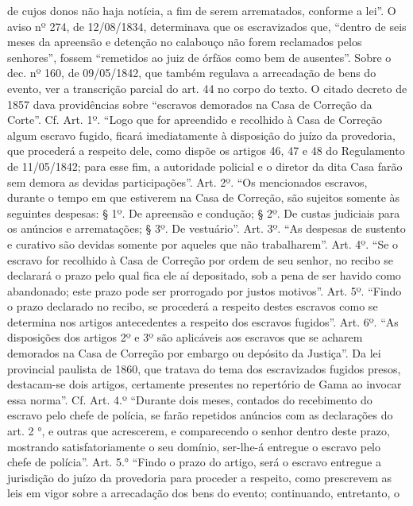 {  de cujos donos não haja notícia, a fim de serem arrematados, conforme
  a lei''. O aviso nº 274, de 12/08/1834, determinava que os escravizados
  que, ``dentro de seis meses da apreensão e detenção no calabouço não
  forem reclamados pelos senhores'', fossem ``remetidos ao juiz de órfãos
  como bem de ausentes''. Sobre o dec. nº 160, de 09/05/1842, que também
  regulava a arrecadação de bens do evento, ver a transcrição parcial do
  art. 44 no corpo do texto. O citado decreto de 1857 dava providências
  sobre ``escravos demorados na Casa de Correção da Corte''. Cf. Art.
  1º. ``Logo que for apreendido e recolhido à Casa de Correção algum
  escravo fugido, ficará imediatamente à disposição do juízo da
  provedoria, que procederá a respeito dele, como dispõe os artigos 46,
  47 e 48 do Regulamento de 11/05/1842; para esse fim, a autoridade
  policial e o diretor da dita Casa farão sem demora as devidas
  participações''. Art. 2º. ``Os mencionados escravos, durante o tempo em
  que estiverem na Casa de Correção, são sujeitos somente às seguintes
  despesas: § 1º. De apreensão e condução; § 2º. De custas judiciais
  para os anúncios e arrematações; § 3º. De vestuário''. Art. 3º. ``As
  despesas de sustento e curativo são devidas somente por aqueles que
  não trabalharem''. Art. 4º. ``Se o escravo for recolhido à Casa de
  Correção por ordem de seu senhor, no recibo se declarará o prazo pelo
  qual fica ele aí depositado, sob a pena de ser havido como abandonado;
  este prazo pode ser prorrogado por justos motivos''. Art. 5º. ``Findo o
  prazo declarado no recibo, se procederá a respeito destes escravos
  como se determina nos artigos antecedentes a respeito dos escravos
  fugidos''. Art. 6º. ``As disposições dos artigos 2º e 3º são aplicáveis
  aos escravos que se acharem demorados na Casa de Correção por embargo
  ou depósito da Justiça''. Da lei provincial paulista de 1860, que
  tratava do tema dos escravizados fugidos presos, destacam-se dois
  artigos, certamente presentes no repertório de Gama ao invocar essa
  norma''. Cf. Art. 4.º ``Durante dois meses, contados do recebimento do
  escravo pelo chefe de polícia, se farão repetidos anúncios com as
  declarações do art. 2 °, e outras que acrescerem, e comparecendo o
  senhor dentro deste prazo, mostrando satisfatoriamente o seu domínio,
  ser-lhe-á entregue o escravo pelo chefe de polícia''. Art. 5.° ``Findo o
  prazo do artigo, será o escravo entregue a jurisdição do juízo da
  provedoria para proceder a respeito, como prescrevem as leis em vigor
  sobre a arrecadação dos bens do evento; continuando, entretanto, o
}

